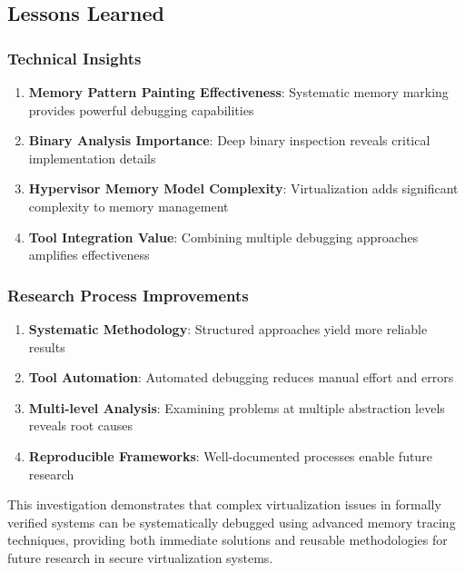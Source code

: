 \documentclass[11pt,a4paper]{article}
\begin{document}
\subsection{Lessons Learned}

\subsubsection{Technical Insights}

\begin{enumerate}
    \item \textbf{Memory Pattern Painting Effectiveness}: Systematic memory marking provides powerful debugging capabilities
    \item \textbf{Binary Analysis Importance}: Deep binary inspection reveals critical implementation details
    \item \textbf{Hypervisor Memory Model Complexity}: Virtualization adds significant complexity to memory management
    \item \textbf{Tool Integration Value}: Combining multiple debugging approaches amplifies effectiveness
\end{enumerate}

\subsubsection{Research Process Improvements}

\begin{enumerate}
    \item \textbf{Systematic Methodology}: Structured approaches yield more reliable results
    \item \textbf{Tool Automation}: Automated debugging reduces manual effort and errors
    \item \textbf{Multi-level Analysis}: Examining problems at multiple abstraction levels reveals root causes
    \item \textbf{Reproducible Frameworks}: Well-documented processes enable future research
\end{enumerate}

This investigation demonstrates that complex virtualization issues in formally verified systems can be systematically debugged using advanced memory tracing techniques, providing both immediate solutions and reusable methodologies for future research in secure virtualization systems.
\end{document}
